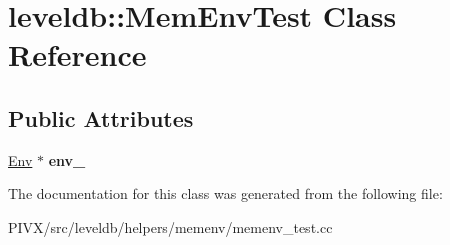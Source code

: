 \hypertarget{classleveldb_1_1_mem_env_test}{}\section{leveldb\+:\+:Mem\+Env\+Test Class Reference}
\label{classleveldb_1_1_mem_env_test}
\subsection*{Public Attributes}
\begin{DoxyCompactItemize}
\item 
\mbox{\label{classleveldb_1_1_mem_env_test_a76f81d9090cc4c3cce4a81d8af745359}} 
\mbox{\hyperlink{classleveldb_1_1_env}{Env}} $\ast$ {\bfseries env\+\_\+}
\end{DoxyCompactItemize}


The documentation for this class was generated from the following file\+:\begin{DoxyCompactItemize}
\item 
P\+I\+V\+X/src/leveldb/helpers/memenv/memenv\+\_\+test.\+cc\end{DoxyCompactItemize}
